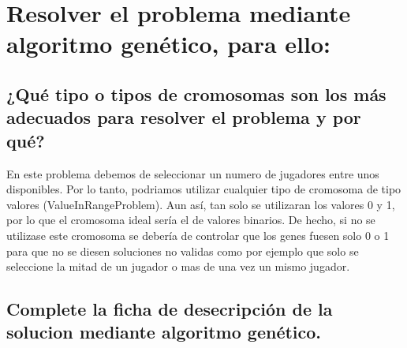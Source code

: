 \documentclass[a4paper,12pt]{article}
\begin{document}
\section{Resolver el problema mediante algoritmo genético, para ello:}
\subsection{¿Qué tipo o tipos de cromosomas son los más adecuados para resolver el problema y por qué?}
En este problema debemos de seleccionar un numero de jugadores entre unos disponibles.
Por lo tanto, podriamos utilizar cualquier tipo de cromosoma de tipo valores (ValueInRangeProblem).
Aun así, tan solo se utilizaran los valores 0 y 1, por lo que el cromosoma ideal sería el de valores binarios.
De hecho, si no se utilizase este cromosoma se debería de controlar que los genes fuesen solo 0 o 1 para que no
se diesen soluciones no validas como por ejemplo que solo se seleccione la mitad de un jugador o mas de una vez un mismo jugador.
\subsection{Complete la ficha de desecripción de la solucion mediante algoritmo genético.}
\end{document}

